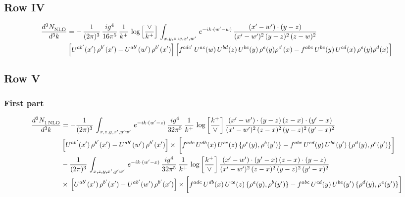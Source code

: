 \documentclass[9pt]{article}
\numberwithin{equation}{section}
\begin{document}
\subsection{Row IV}
\begin{align}
    \frac{d^{3}N_{\rm NLO}^{\rm}}{d^{3}k}  & = -\, \frac{1}{(2\pi)^{3}}\,\frac{ig^{4}}{16\pi^{5}}\,\frac{1}{k^{+}}\,\log{\left[\frac{\vee}{k^{+}}\right]}\,
    \int_{x,y,z,w,x',w'}\,e^{-ik\cdot (w^\prime-w)}\, \frac{(x'-w')\cdot (y-z)}{(x'-w')^{2}\,(y-z)^{2}\,(z-w)^{2}}\notag \\ &   \left[U^{ab'}(x')\,\rho^{b'}(x')-U^{ab'}(w')\,\rho^{b'}(x')\right] \left[f^{cdc'}\,U^{ac}(w)\,U^{bd}(z)\,U^{be}(y)\,\rho^{e}(y)\rho^{c'}(x)-f^{abc}\,U^{be}(y)\,U^{cd}(x)\,\rho^{e}(y)\rho^{d}(x)\right]
\end{align}
\subsection{Row V}
\subsubsection*{First part}
\begin{align}
     \frac{d^{3}N_{1\,\rm NLO}^{\rm}}{d^{3}k}  & = -\frac{1}{(2\pi)^{3}}\, \int_{x,z,y,x',y'w'}\,e^{-ik\cdot (w^\prime-z)}\,\frac{ig^{4}}{32\pi^{5}}\, \frac{1}{k^{+}}\,\log{\left[\frac{k^{+}}{\vee}\right]}\,\frac{(x'-w')\cdot (y-z)\,(z-x)\cdot (y'-x)}{(x'-w')^{2}\,(z-x)^{2}\,(y-z)^{2}\,(y'-x)^{2}}\,\notag \\ & \left[U^{ab'}(x')\,\rho^{b'}(x')-U^{ab'}(w')\,\rho^{b'}(x')\right]\times\, \bigg[f^{adc}\,U^{db}(x)\,U^{ce}(z)\, \{\rho^{e}(y),\rho^{b}(y')\}-f^{abc}\,U^{cd}(y)\,U^{be}(y')\, \{\rho^{d}(y),\rho^{e}(y')\}\bigg]\notag \\ &  -\frac{1}{(2\pi)^{3}}\, \int_{x,z,y,x',y'w'}\,e^{-ik\cdot (w^\prime-x)}\,\frac{ig^{4}}{32\pi^{5}}\, \frac{1}{k^{+}}\, \log{\left[\frac{k^{+}}{\vee}\right]}\,\frac{(x'-w')\cdot (y'-x)\,(z-x)\cdot (y-z)}{(x'-w')^{2}\,(z-x)^{2}\,(y-z)^{2}\,(y'-x)^{2}}\notag \\ & \times\, \left[U^{ab'}(x')\,\rho^{b'}(x')-U^{ab'}(w')\,\rho^{b'}(x')\right]\times \bigg[f^{adc}\,U^{db}(x)\,U^{ce}(z)\, \{\rho^{e}(y),\rho^{b}(y')\}-f^{abc}\,U^{cd}(y)\,U^{be}(y')\, \{\rho^{d}(y),\rho^{e}(y')\}\bigg]
\end{align}
\end{document}
